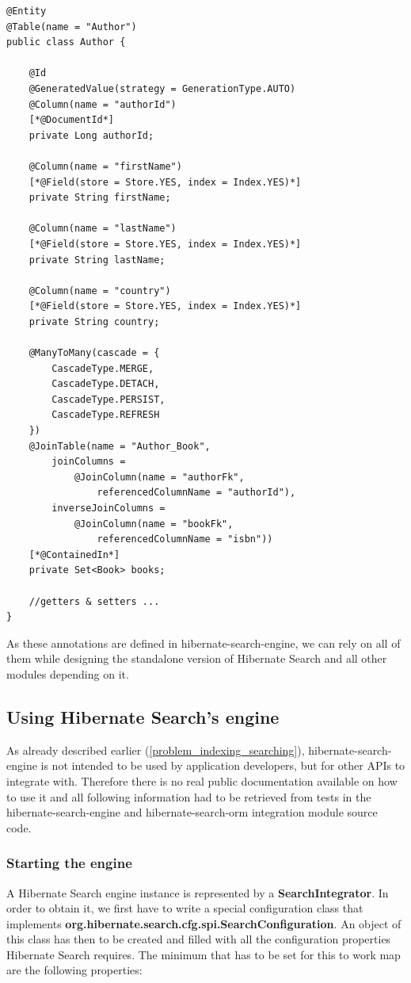\lstset{language=java}
\begin{lstlisting}[frame=htrbl, caption={Author.java with Hibernate Search annotations}, label={lst:author.java_2}]
@Entity
@Table(name = "Author")
public class Author {

	@Id
	@GeneratedValue(strategy = GenerationType.AUTO)
	@Column(name = "authorId")
	[*@DocumentId*]
	private Long authorId;
	
	@Column(name = "firstName")
	[*@Field(store = Store.YES, index = Index.YES)*]
	private String firstName;
	
	@Column(name = "lastName")
	[*@Field(store = Store.YES, index = Index.YES)*]
	private String lastName;
	
	@Column(name = "country")
	[*@Field(store = Store.YES, index = Index.YES)*]
	private String country;
	
	@ManyToMany(cascade = {
		CascadeType.MERGE, 
		CascadeType.DETACH, 
		CascadeType.PERSIST, 
		CascadeType.REFRESH
	})
	@JoinTable(name = "Author_Book", 
		joinColumns = 
			@JoinColumn(name = "authorFk", 
				referencedColumnName = "authorId"),
		inverseJoinColumns = 
			@JoinColumn(name = "bookFk", 
				referencedColumnName = "isbn"))
	[*@ContainedIn*]
	private Set<Book> books;
	
	//getters & setters ...
}
\end{lstlisting}
\noindent
As these annotations are defined in hibernate-search-engine, we can rely on all of them while designing the standalone version of Hibernate Search and all other modules depending on it.

\pagebreak

\subsection{Using Hibernate Search's engine} \label{using_hsearch_engine}

As already described earlier (\ref{problem_indexing_searching}), hibernate-search-engine is not intended to be used by application developers, but for other APIs to integrate with. Therefore there is no real public documentation available on how to use it and all following information had to be retrieved from tests in the hibernate-search-engine and hibernate-search-orm integration module source code.

\subsubsection{Starting the engine}
A Hibernate Search engine instance is represented by a \textbf{SearchIntegrator}. In order to obtain it, we first have to write a special configuration class that implements \textbf{org.hibernate.search.cfg.spi.SearchConfiguration}. An object of this class has then to be created and filled with all the configuration properties Hibernate Search requires. The minimum that has to be set for this to work map are the following properties:

